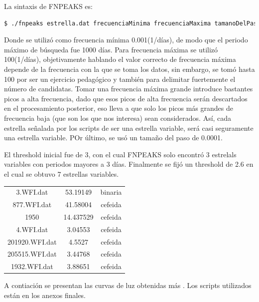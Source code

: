 \documentclass[12pt]{article}
\begin{document}
La sintaxis de FNPEAKS es:
\begin{lstlisting}[language=bash]
$ ./fnpeaks estrella.dat frecuenciaMinima frecuenciaMaxima tamanoDelPaso
\end{lstlisting}
Donde se utilizó como frecuencia mínima 0.001(1/días), de modo que el periodo máximo de búsqueda fue 1000 días. Para frecuencia máxima se utilizó 100(1/días), objetivamente hablando el valor correcto de frecuencia máxima depende de la frecuencia con la que se toma los datos, sin embargo, se tomó hasta 100 por ser un ejercicio pedagógico y también para delimitar fuertemente el número de candidatas. Tomar una frecuencia máxima grande introduce bastantes picos a alta frecuencia, dado que esos picos de alta frecuencia serán descartados en el procesamiento posterior,  eso lleva a que solo los picos más grandes de frecuencia baja (que son los que nos interesa) sean considerados. Así, cada estrella señalada por los scripts de ser una estrella variable, será casi seguramente una estrella variable. POr último, se usó un tamaño del paso de 0.0001.

El threshold inicial fue de 3, con el cual FNPEAKS solo encontró 3 estrelals variables con periodos mayores a 3 días. Finalmente se fijó un threshold de 2.6 en el cual se obtuvo 7 estrellas variables.



\begin{table}[htb]
    \centering
    \label{tabla}
	\begin{tabular}{|c|c|c }
	\hline
	3.WFI.dat & 53.19149 & binaria \\
	877.WFI.dat & 41.58004 & cefeida\\
	1950 & 14.437529 & cefeida \\
	4.WFI.dat & 3.04553  & cefeida  \\
	201920.WFI.dat & 4.5527 & cefeida \\
	205515.WFI.dat & 3.44768 &cefeida \\
	1932.WFI.dat & 3.88651 & cefeida\\
\hline
	\end{tabular}
\end{table}


A contiación se presentan las curvas de luz obtenidas más . Los scripts utilizados están en los anexos finales.
\end{document}
